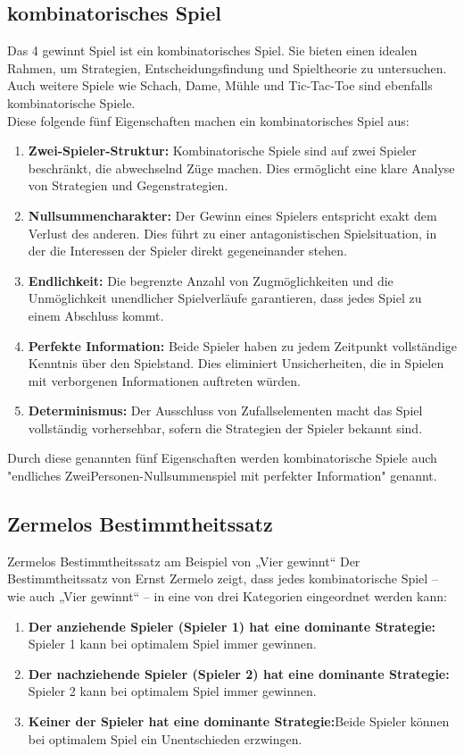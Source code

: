 \subsection{kombinatorisches Spiel}
Das 4 gewinnt Spiel ist ein kombinatorisches Spiel. Sie bieten einen idealen Rahmen, um Strategien, Entscheidungsfindung und Spieltheorie zu untersuchen. Auch weitere Spiele wie Schach, Dame, Mühle und Tic-Tac-Toe sind ebenfalls kombinatorische Spiele. \\
Diese folgende fünf Eigenschaften machen ein kombinatorisches Spiel aus:
\begin{enumerate}
	\item   \textbf{Zwei-Spieler-Struktur: }Kombinatorische Spiele sind auf zwei Spieler beschränkt, die abwechselnd Züge machen. Dies ermöglicht eine klare Analyse von Strategien und Gegenstrategien.
	\item 	\textbf{Nullsummencharakter: }Der Gewinn eines Spielers entspricht exakt dem Verlust des anderen. Dies führt zu einer antagonistischen Spielsituation, in der die Interessen der Spieler direkt gegeneinander stehen.
	\item 	\textbf{Endlichkeit: }Die begrenzte Anzahl von Zugmöglichkeiten und die Unmöglichkeit unendlicher Spielverläufe garantieren, dass jedes Spiel zu einem Abschluss kommt.
	\item 	\textbf{Perfekte Information: }Beide Spieler haben zu jedem Zeitpunkt vollständige Kenntnis über den Spielstand. Dies eliminiert Unsicherheiten, die in Spielen mit verborgenen Informationen auftreten würden.
	\item 	\textbf{Determinismus:} Der Ausschluss von Zufallselementen macht das Spiel vollständig vorhersehbar, sofern die Strategien der Spieler bekannt sind.
\end{enumerate}
	Durch diese genannten fünf Eigenschaften werden kombinatorische Spiele auch "endliches ZweiPersonen-Nullsummenspiel mit perfekter Information" genannt.
	
	\subsection{Zermelos Bestimmtheitssatz}
	Zermelos Bestimmtheitssatz am Beispiel von „Vier gewinnt“
	Der Bestimmtheitssatz von Ernst Zermelo zeigt, dass jedes kombinatorische Spiel – wie auch „Vier gewinnt“ – in eine von drei Kategorien eingeordnet werden kann:
	\begin{enumerate}
		\item \textbf{Der anziehende Spieler (Spieler 1) hat eine dominante Strategie: }Spieler 1 kann bei optimalem Spiel immer gewinnen.
		\item \textbf{Der nachziehende Spieler (Spieler 2) hat eine dominante Strategie:} Spieler 2 kann bei optimalem Spiel immer gewinnen.
		\item \textbf{Keiner der Spieler hat eine dominante Strategie:}Beide Spieler können bei optimalem Spiel ein Unentschieden erzwingen.
	\end{enumerate}
	
